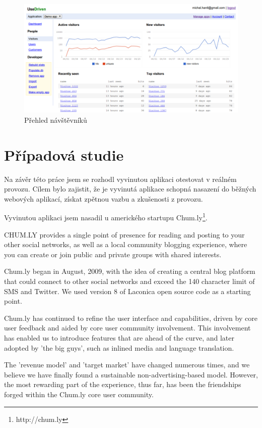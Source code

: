\documentclass[bc,female,java,dept456]{diploma}						%
\begin{document}
\begin{figure}[h]
	\centering
	\includegraphics[width=15cm]{img/ud_visitors_2.pdf}
	\caption{Přehled návštěvníků}
	\label{img:ud_dashboard}
\end{figure}





\section{Případová studie}

Na závěr této práce jsem se rozhodl vyvinutou aplikaci otestovat v reálném provozu. Cílem bylo zajistit, že je vyvinutá aplikace schopná nasazení do běžných webových aplikací, získat zpětnou vazbu a zkušenosti z provozu. 

Vyvinutou aplikaci jsem nasadil u amerického startupu Chum.ly\footnote{http://chum.ly}. 


CHUM.LY provides a single point of presence for reading and posting to your other social networks, as well as a local community blogging experience, where you can create or join public and private groups with shared interests.

Chum.ly began in August, 2009, with the idea of creating a central blog platform that could connect to other social networks and exceed the 140 character limit of SMS and Twitter. We used version 8 of Laconica open source code as a starting point.

Chum.ly has continued to refine the user interface and capabilities, driven by core user feedback and aided by core user community involvement. This involvement has enabled us to introduce features that are ahead of the curve, and later adopted by 'the big guys', such as inlined media and language translation. 

The 'revenue model' and 'target market' have changed numerous times, and we believe we have finally found a sustainable non-advertising-based model. However, the most rewarding part of the experience, thus far, has been the friendships forged within the Chum.ly core user community.
\end{document}
